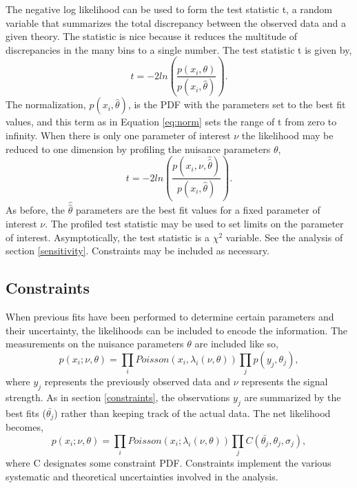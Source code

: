The negative log likelihood can be used to form the test statistic t, a random variable that summarizes the total discrepancy between the observed data and a given theory. The statistic is nice because it reduces the multitude of discrepancies in the many bins to a single number. The test statistic t is given by, 
\begin{equation}
t = -2ln\left(\frac{p(x_i,\theta)}{p(x_i,\hat{\theta})}\right).
\end{equation}
The normalization, $p(x_i,\hat{\theta})$, is the PDF with the parameters set to the best fit values, and this term as in Equation \ref{eq:norm} sets the range of t from zero to infinity. When there is only one parameter of interest $\nu$ the likelihood may be reduced to one dimension by profiling the nuisance parameters $\theta$,
\begin{equation}
t = -2ln\left(\frac{p(x_i,\nu,\hat{\hat{\theta}})}{p(x_i,\hat{\theta})}\right).
\end{equation}
As before, the $\hat{\hat{\theta}}$ parameters are the best fit values for a fixed parameter of interest $\nu$. The profiled test statistic may be used to set limits on the parameter of interest. Asymptotically, the test statistic is a $\chi^2$ variable. See the analysis of section \ref{sensitivity}. Constraints may be included as necessary. 

\subsection{Constraints}

When previous fits have been performed to determine certain parameters and their uncertainty, the likelihoods can be included to encode the information. The measurements on the nuisance parameters $\theta$ are included like so,
\begin{equation}
p(x_i; \nu, \theta) = \prod_i Poisson(x_i, \lambda_i(\nu, \theta))\prod_j p(y_j, \theta_j),
\end{equation}
where $y_j$ represents the previously observed data and $\nu$ represents the signal strength. As in section \ref{constraints}, the observations $y_j$ are summarized by the best fits ($\bar{\theta_j}$) rather than keeping track of the actual data. The net likelihood becomes,
\begin{equation}
p(x_i; \nu, \theta) = \prod_i Poisson(x_i; \lambda_i(\nu, \theta))\prod_j C(\bar{\theta_j}, \theta_j, \sigma_j),
\end{equation}
where C designates some constraint PDF. Constraints implement the various systematic and theoretical uncertainties involved in the analysis.  

